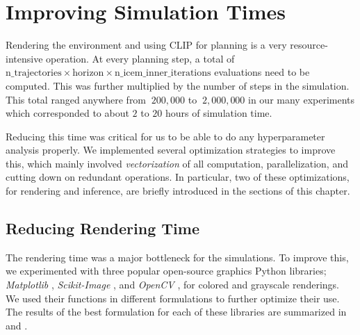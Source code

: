 \chapter{Improving Simulation Times}
\label{sec:efficiency}
Rendering the environment and using CLIP for planning is a very resource-intensive operation.
At every planning step, a total of \(\text{n\_trajectories} \times \text{horizon} \times \text{n\_icem\_inner\_iterations}\) evaluations need to be computed.
This was further multiplied by the number of steps in the simulation.
This total ranged anywhere from \(~200,000\) to \(~2,000,000\) in our many experiments which corresponded to about \(2\) to \(20\) hours of simulation time.

Reducing this time was critical for us to be able to do any hyperparameter analysis properly.
We implemented several optimization strategies to improve this, which mainly involved \emph{vectorization} of all computation, parallelization, and cutting down on redundant operations.
In particular, two of these optimizations, for rendering and inference, are briefly introduced in the sections of this chapter.

\section{Reducing Rendering Time}
\label{sec:improving-render}
The rendering time was a major bottleneck for the simulations.
To improve this, we experimented with three popular open-source graphics Python libraries; \emph{Matplotlib} \citep{matplotlib}, \emph{Scikit-Image} \citep{skimage}, and \emph{OpenCV} \citep{opencv}, for colored and grayscale renderings.
We used their functions in different formulations to further optimize their use.
The results of the best formulation for each of these libraries are summarized in  and .\\

